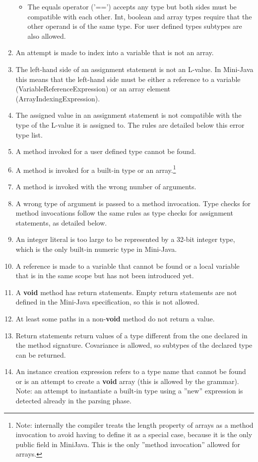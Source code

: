 \documentclass[a4paper,11pt]{article}
\begin{document}
\begin{enumerate}
\begin{itemize}
\item The equals operator ('==') accepts any type but both sides must be compatible with each other. Int, boolean and array types require that the other operand is of the same type. For user defined types subtypes are also allowed.
\end{itemize}
\item An attempt is made to index into a variable that is not an array.
\item The left-hand side of an assignment statement is not an L-value. In Mini-Java this means that the left-hand side must be either a reference to a variable (VariableReferenceExpression) or an array element (ArrayIndexingExpression).
\item The assigned value in an assignment statement is not compatible with the type of the L-value it is assigned to. The rules are detailed below this error type list.
\item A method invoked for a user defined type cannot be found.
\item A method is invoked for a built-in type or an array.\footnote{Note: internally the compiler treats the length property of arrays as a method invocation to avoid having to define it as a special case, because it is the only public field in MiniJava. This is the only ''method invocation'' allowed for arrays.}
\item A method is invoked with the wrong number of arguments.
\item A wrong type of argument is passed to a method invocation. Type checks for method invocations follow the same rules as type checks for assignment statements, as detailed below.
\item An integer literal is too large to be represented by a 32-bit integer type, which is the only built-in numeric type in Mini-Java.
\item A reference is made to a variable that cannot be found or a local variable that is in the same scope but has not been introduced yet.
\item A \textbf{void} method has return statements. Empty return statements are not defined in the Mini-Java specification, so this is not allowed.
\item At least some paths in a non-\textbf{void} method do not return a value.
\item Return statements return values of a type different from the one declared in the method signature. Covariance is allowed, so subtypes of the declared type can be returned.
\item An instance creation expression refers to a type name that cannot be found or is an attempt to create a \textbf{void} array (this is allowed by the grammar). Note: an attempt to instantiate a built-in type using a ''new'' expression is detected already in the parsing phase.

\end{enumerate}
\end{document}
